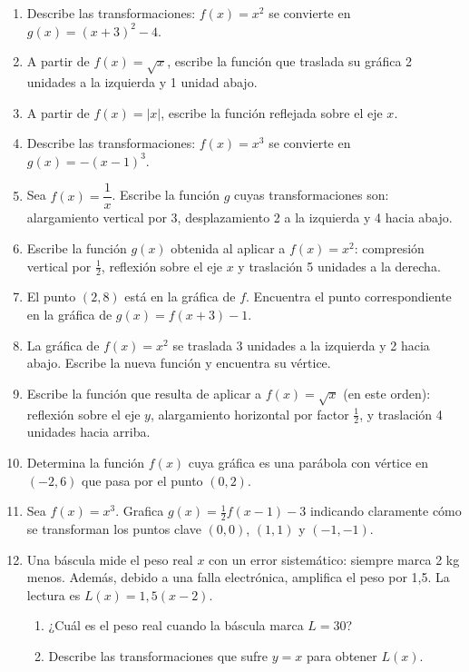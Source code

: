 \documentclass[12pt, letterpaper]{article}
\begin{document}
\begin{enumerate}[series=ejercicios, leftmargin=*]
  \item \facil{} Describe las transformaciones: $f(x) = x^2$ se convierte en $g(x) = (x + 3)^2 - 4$.

  \item \facil{} A partir de $f(x) = \sqrt{x}$, escribe la función que traslada su gráfica 2 unidades a la izquierda y 1 unidad abajo.

  \item \facil{} A partir de $f(x) = |x|$, escribe la función reflejada sobre el eje $x$.

  \item \facil{} Describe las transformaciones: $f(x) = x^3$ se convierte en $g(x) = -(x - 1)^3$.

  \item \medio{} Sea $f(x) = \dfrac{1}{x}$. Escribe la función $g$ cuyas transformaciones son: alargamiento vertical por 3, desplazamiento 2 a la izquierda y 4 hacia abajo.

  \item \medio{} Escribe la función $g(x)$ obtenida al aplicar a $f(x) = x^2$: compresión vertical por $\frac{1}{2}$, reflexión sobre el eje $x$ y traslación 5 unidades a la derecha.

  \item \medio{} El punto $(2, 8)$ está en la gráfica de $f$. Encuentra el punto correspondiente en la gráfica de $g(x) = f(x + 3) - 1$.

  \item \medio{} La gráfica de $f(x) = x^2$ se traslada 3 unidades a la izquierda y 2 hacia abajo. Escribe la nueva función y encuentra su vértice.

  \item \dificil{} Escribe la función que resulta de aplicar a $f(x) = \sqrt{x}$ (en este orden): reflexión sobre el eje $y$, alargamiento horizontal por factor $\frac{1}{2}$, y traslación 4 unidades hacia arriba.

  \item \dificil{} Determina la función $f(x)$ cuya gráfica es una parábola con vértice en $(-2, 6)$ que pasa por el punto $(0, 2)$.

  \item \dificil{} Sea $f(x) = x^3$. Grafica $g(x) = \frac{1}{2}f(x - 1) - 3$ indicando claramente cómo se transforman los puntos clave $(0, 0)$, $(1, 1)$ y $(-1, -1)$.

  \item \dificil{} Una báscula mide el peso real $x$ con un error sistemático: siempre marca 2 kg menos. Además, debido a una falla electrónica, amplifica el peso por 1,5. La lectura es $L(x) = 1{,}5(x - 2)$.
        \begin{enumerate}[label=\alph*)]
          \item ¿Cuál es el peso real cuando la báscula marca $L = 30$?
          \item Describe las transformaciones que sufre $y = x$ para obtener $L(x)$.
        \end{enumerate}
\end{enumerate}
\end{document}
